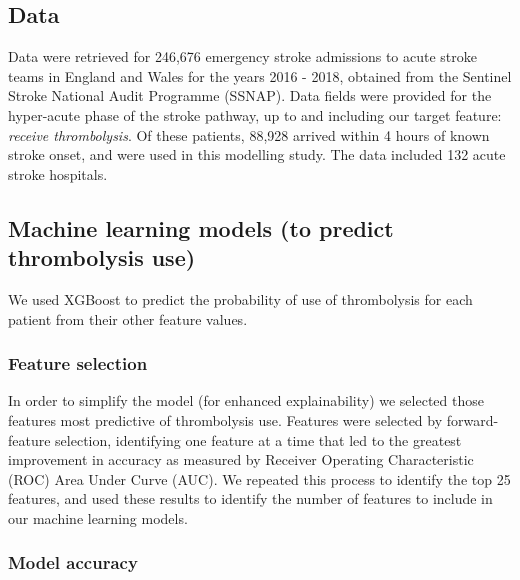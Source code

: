 
\subsection{Data}

Data were retrieved for 246,676 emergency stroke admissions to acute stroke teams in England and Wales for the years 2016 - 2018, obtained from the Sentinel Stroke National Audit Programme (SSNAP). Data fields were provided for the hyper-acute phase of the stroke pathway, up to and including our target feature: \emph{receive thrombolysis}. Of these patients, 88,928 arrived within 4 hours of known stroke onset, and were used in this modelling study. The data included 132 acute stroke hospitals.


\subsection{Machine learning models (to predict thrombolysis use)}

We used XGBoost \cite{chen_xgboost_2016} to predict the probability of use of thrombolysis for each patient from their other feature values.


\subsubsection{Feature selection}

In order to simplify the model (for enhanced explainability) we selected those features most predictive of thrombolysis use. Features were selected by forward-feature selection, identifying one feature at a time that led to the greatest improvement in accuracy as measured by Receiver Operating Characteristic (ROC) Area Under Curve (AUC). We repeated this process to identify the top 25 features, and used these results to identify the number of features to include in our machine learning models.


\subsubsection{Model accuracy}

